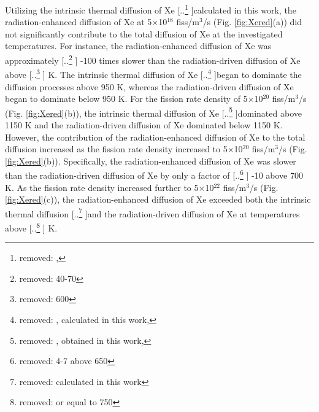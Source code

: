 \documentclass[preprint,12pt]{elsarticle}
\providecommand{\DIFadd}[1]{{\protect\color{blue} \sf #1}} %
\providecommand{\DIFdel}[1]{{\protect\color{red} [..\footnote{removed: #1} ]}} %
\providecommand{\DIFaddbegin}{} %
\providecommand{\DIFaddend}{} %
\providecommand{\DIFdelbegin}{} %
\providecommand{\DIFdelend}{} %
\newcommand{\DIFscaledelfig}{0.5}
\newlength{\DIFdelgraphicswidth} %
\newlength{\DIFdelgraphicsheight} %
\newcommand{\DIFaddincludegraphics}[2][]{{\color{blue}\fbox{\DIFOincludegraphics[#1]{#2}}}} %
\newcommand{\DIFdelincludegraphics}[2][]{%
\sbox{\DIFdelgraphicsbox}{\DIFOincludegraphics[#1]{#2}}%
\settoboxwidth{\DIFdelgraphicswidth}{\DIFdelgraphicsbox} %
\settoboxtotalheight{\DIFdelgraphicsheight}{\DIFdelgraphicsbox} %
\scalebox{\DIFscaledelfig}{%
\parbox[b]{\DIFdelgraphicswidth}{\usebox{\DIFdelgraphicsbox}\\[-\baselineskip] \rule{\DIFdelgraphicswidth}{0em}}\llap{\resizebox{\DIFdelgraphicswidth}{\DIFdelgraphicsheight}{%
\setlength{\unitlength}{\DIFdelgraphicswidth}%
\begin{picture}(1,1)%
\thicklines\linethickness{2pt} %
{\color[rgb]{1,0,0}\put(0,0){\framebox(1,1){}}}%
{\color[rgb]{1,0,0}\put(0,0){\line( 1,1){1}}}%
{\color[rgb]{1,0,0}\put(0,1){\line(1,-1){1}}}%
\end{picture}%
}\hspace*{3pt}}} %
} %
\DeclareRobustCommand{\DIFaddbegin}{\DIFOaddbegin \let\includegraphics\DIFaddincludegraphics} %
\DeclareRobustCommand{\DIFaddend}{\DIFOaddend \let\includegraphics\DIFOincludegraphics} %
\DeclareRobustCommand{\DIFdelbegin}{\DIFOdelbegin \let\includegraphics\DIFdelincludegraphics} %
\DeclareRobustCommand{\DIFdelend}{\DIFOaddend \let\includegraphics\DIFOincludegraphics} %
\begin{document}
\DIFadd{Utilizing }\DIFaddend the intrinsic thermal diffusion of Xe \DIFdelbegin \DIFdel{, }\DIFdelend calculated in this work, the radiation-enhanced diffusion of Xe at 5$\times$10$^{18}$ fiss/m$^{3}$/s (Fig. \ref{fig:Xered}(a)) did not significantly contribute to the total diffusion of Xe at the investigated temperatures. For instance, the radiation-enhanced diffusion of Xe was approximately \DIFdelbegin \DIFdel{40-70 }\DIFdelend \DIFaddbegin \DIFadd{30-100 }\DIFaddend times slower than the radiation-driven diffusion of Xe above \DIFdelbegin \DIFdel{600 }\DIFdelend \DIFaddbegin \DIFadd{700 }\DIFaddend K.  The intrinsic thermal diffusion of Xe \DIFdelbegin \DIFdel{, calculated in this work, }\DIFdelend began to dominate the diffusion processes above 950 K, whereas the radiation-driven diffusion of Xe began to dominate below 950 K. For the fission rate density of 5$\times$10$^{20}$ fiss/m$^{3}$/s (Fig. \ref{fig:Xered}(b)), the intrinsic thermal diffusion of Xe \DIFdelbegin \DIFdel{, obtained in this work, }\DIFdelend dominated above 1150 K and the radiation-driven diffusion of Xe dominated below 1150 K. However, the contribution of the radiation-enhanced diffusion of Xe to the total diffusion increased as the fission rate density increased to 5$\times$10$^{20}$ fiss/m$^{3}$/s (Fig. \ref{fig:Xered}(b)). Specifically, the radiation-enhanced diffusion of Xe was slower than the radiation-driven diffusion of Xe by only a factor of \DIFdelbegin \DIFdel{4-7 above 650 }\DIFdelend \DIFaddbegin \DIFadd{3-10 above 700 }\DIFaddend K. As the fission rate density increased further to 5$\times$10$^{22}$ fiss/m$^{3}$/s (Fig. \ref{fig:Xered}(c)), the radiation-enhanced diffusion of Xe exceeded both the intrinsic thermal diffusion \DIFdelbegin \DIFdel{calculated in this work }\DIFdelend and the radiation-driven diffusion of Xe at temperatures above \DIFdelbegin \DIFdel{or equal to 750 }\DIFdelend \DIFaddbegin \DIFadd{700 }\DIFaddend K. \\
\end{document}
